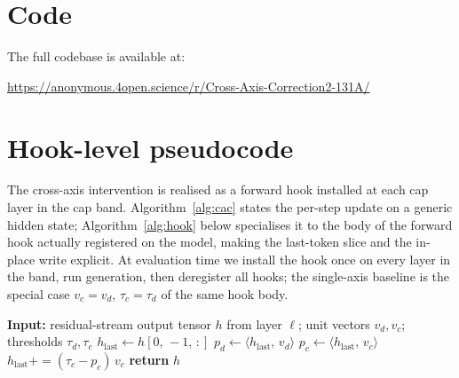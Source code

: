 \documentclass{article}
\begin{document}
\appendix

\section{Code}
\label{app:repo}

The full codebase is available at:
\begin{center}
\url{https://anonymous.4open.science/r/Cross-Axis-Correction2-131A/}
\end{center}

\section{Hook-level pseudocode}
\label{app:code}

The cross-axis intervention is realised as a forward hook installed at
each cap layer in the cap band. Algorithm~\ref{alg:cac} states the
per-step update on a generic hidden state; Algorithm~\ref{alg:hook}
below specialises it to the body of the forward hook actually
registered on the model, making the last-token slice and the in-place
write explicit. At evaluation time we install the hook once on every
layer in the band, run generation, then deregister all hooks; the
single-axis baseline is the special case $v_c \!=\! v_d$,
$\tau_c \!=\! \tau_d$ of the same hook body.

\begin{algorithm}[h]
\caption{Body of the forward hook executed at each cap layer on every
forward pass.}
\label{alg:hook}
\begin{algorithmic}[1]
\STATE \textbf{Input:} residual-stream output tensor $h$ from layer
       $\ell$; unit vectors $v_d, v_c$; thresholds $\tau_d, \tau_c$
\STATE $h_{\mathrm{last}} \gets h[0,\,-1,\,:]$
\STATE $p_d \gets \langle h_{\mathrm{last}},\, v_d \rangle$
    \STATE $p_c \gets \langle h_{\mathrm{last}},\, v_c \rangle$
        \STATE $h_{\mathrm{last}} \mathrel{{+}{=}} (\tau_c - p_c)\, v_c$
    \ENDIF
\ENDIF
\STATE \textbf{return} $h$
\end{algorithmic}
\end{algorithm}
\end{document}
